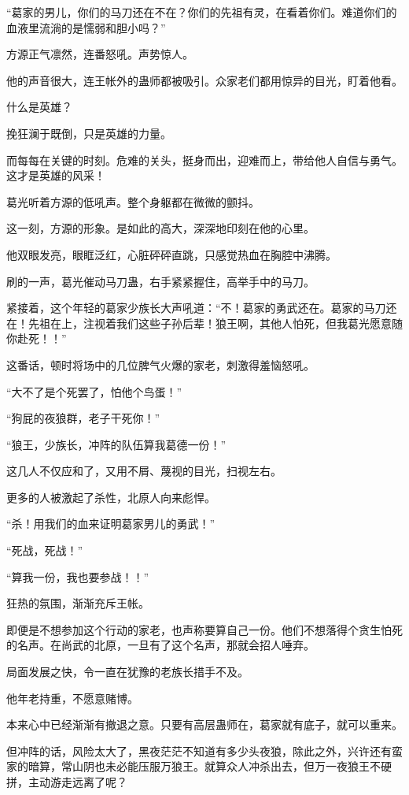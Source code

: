 \begin{this_body}
“葛家的男儿，你们的马刀还在不在？你们的先祖有灵，在看着你们。难道你们的血液里流淌的是懦弱和胆小吗？”

方源正气凛然，连番怒吼。声势惊人。

他的声音很大，连王帐外的蛊师都被吸引。众家老们都用惊异的目光，盯着他看。

什么是英雄？

挽狂澜于既倒，只是英雄的力量。

而每每在关键的时刻。危难的关头，挺身而出，迎难而上，带给他人自信与勇气。这才是英雄的风采！

葛光听着方源的低吼声。整个身躯都在微微的颤抖。

这一刻，方源的形象。是如此的高大，深深地印刻在他的心里。

他双眼发亮，眼眶泛红，心脏砰砰直跳，只感觉热血在胸腔中沸腾。

刷的一声，葛光催动马刀蛊，右手紧紧握住，高举手中的马刀。

紧接着，这个年轻的葛家少族长大声吼道：“不！葛家的勇武还在。葛家的马刀还在！先祖在上，注视着我们这些子孙后辈！狼王啊，其他人怕死，但我葛光愿意随你赴死！！”

这番话，顿时将场中的几位脾气火爆的家老，刺激得羞恼怒吼。

“大不了是个死罢了，怕他个鸟蛋！”

“狗屁的夜狼群，老子干死你！”

“狼王，少族长，冲阵的队伍算我葛德一份！”

这几人不仅应和了，又用不屑、蔑视的目光，扫视左右。

更多的人被激起了杀性，北原人向来彪悍。

“杀！用我们的血来证明葛家男儿的勇武！”

“死战，死战！”

“算我一份，我也要参战！！”

狂热的氛围，渐渐充斥王帐。

即便是不想参加这个行动的家老，也声称要算自己一份。他们不想落得个贪生怕死的名声。在尚武的北原，一旦有了这个名声，那就会招人唾弃。

局面发展之快，令一直在犹豫的老族长措手不及。

他年老持重，不愿意赌博。

本来心中已经渐渐有撤退之意。只要有高层蛊师在，葛家就有底子，就可以重来。

但冲阵的话，风险太大了，黑夜茫茫不知道有多少头夜狼，除此之外，兴许还有蛮家的暗算，常山阴也未必能压服万狼王。就算众人冲杀出去，但万一夜狼王不硬拼，主动游走远离了呢？


\end{this_body}

